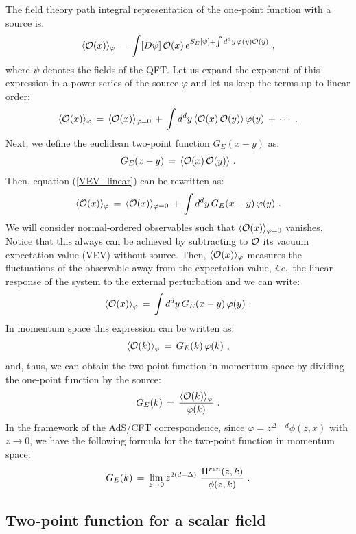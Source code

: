 \documentclass[12pt,notitlepage,a4paper]{article}
\newcommand{\beq}{\begin{equation}}
\newcommand{\eeq}{\end{equation}}
\def\ie{{\emph{i.e.}}}
\begin{document}
The field theory path integral representation of the one-point function with  a source is:
\beq
\langle {\cal O}(x)\rangle_{\varphi}\,=\,
\int [D\psi]\,  {\cal O}(x)\, e^{S_E[\psi]+\int d^dy \,\varphi(y) {\cal O}(y) }\,\,,
\eeq
where $\psi$ denotes the fields of the QFT. Let us expand the exponent of this expression in a power series of the source $\varphi$ and let us keep the terms up to linear order:
\beq
\langle {\cal O}(x)\rangle_{\varphi}\,=\,\langle {\cal O}(x)\rangle_{\varphi=0}\,+\,
\int d^dy\,\langle {\cal O}(x)\, {\cal O}(y)\rangle\, \varphi(y)\,+\,\cdots\,\,.
\label{VEV_linear}
\eeq
Next, we define the euclidean two-point function $G_E(x-y)$ as:
\beq
G_E(x-y)\,=\,\langle {\cal O}(x)\, {\cal O}(y)\rangle\,\,.
\eeq
Then,  equation (\ref{VEV_linear}) can be rewritten as:
\beq
\langle {\cal O}(x)\rangle_{\varphi}\,=\,\langle {\cal O}(x)\rangle_{\varphi=0}\,+\,
\int d^dy\,G_E(x-y)\, \varphi(y)\,\,.
\eeq
We will consider normal-ordered observables such that 
$\langle {\cal O}(x)\rangle_{\varphi=0}$ vanishes. Notice that this always can be achieved by subtracting to ${\cal O}$  its  vacuum expectation value (VEV)  without source. Then, $\langle {\cal O}(x)\rangle_{\varphi}$ measures the fluctuations of the observable away from the expectation value, \ie\ the linear response of the system to the external perturbation and we can write:
\beq
\langle {\cal O}(x)\rangle_{\varphi}\,=\,\int d^dy\,G_E(x-y)\, \varphi(y)\,\,.
\eeq
In momentum space this expression can be written as:
\beq
\langle {\cal O}( k)\rangle_{\varphi}\,=\,
G_E( k)\,\varphi(k)\,\,,
\eeq
and, thus, we can obtain the two-point function in momentum space by dividing the one-point function by the source:
\beq
G_E(k)\,=\,{\langle {\cal O}( k)\rangle_{\varphi}
\over \varphi(k)}\,\,.
\label{G_E_varphi}
\eeq
In  the framework of the AdS/CFT correspondence,  since $\varphi=z^{\Delta-d} \phi(z,x)$ with $z\to 0$, we have the following formula for the two-point function in momentum  space:
\beq
G_E( k)\,=\,\lim_{z\to 0} z^{2(d-\Delta)}\,\,
{\Pi^{ren}(z, k)\over \phi(z, k)}\,\,.
\eeq

\subsection{Two-point function for a scalar field}
\end{document}
